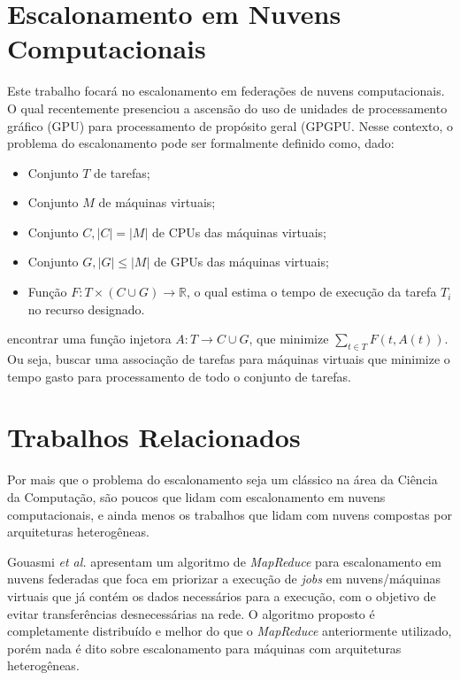 \section{Escalonamento em Nuvens Computacionais}

Este trabalho focará no escalonamento em federações de nuvens computacionais. O qual recentemente presenciou a ascensão do uso de unidades de processamento gráfico (\acrfull{GPU}) para processamento de propósito geral (\acrfull{GPGPU}\cite{Dimitrov:2009:USA:1513895.1513907}\cite{Yang:2010:GCM:1809028.1806606}. Nesse contexto, o problema do escalonamento pode ser formalmente definido como, dado:\\

\begin{itemize}
	\item Conjunto $T$ de tarefas;
	\item Conjunto $M$ de máquinas virtuais;
	\item Conjunto $C, |C| = |M|$ de CPUs das máquinas virtuais;
	\item Conjunto $G,  |G| \le |M|$ de GPUs das máquinas virtuais;
	\item Função $F: T \times (C \cup G) \to \mathbb{R}$, o qual estima o tempo de execução da tarefa $T_{i}$ no recurso designado.
\end{itemize}
encontrar uma função injetora $A: T \to C \cup G$, que minimize $\sum_{t \in T} F(t, A(t) )$.\\

Ou seja, buscar uma associação de tarefas para máquinas virtuais que minimize o tempo gasto para processamento de todo o conjunto de tarefas.

\section{Trabalhos Relacionados}

Por mais que o problema do escalonamento seja um clássico na área da Ciência da Computação, são poucos que lidam com escalonamento em nuvens computacionais, e ainda menos os trabalhos que lidam com nuvens compostas por arquiteturas heterogêneas. 

Gouasmi \textit{et al.} \cite{MapReduce_sched_8034997} apresentam um algoritmo de \textit{MapReduce}\cite{Dean:2008:MSD:1327452.1327492} para escalonamento em nuvens federadas que foca em priorizar a execução de \textit{jobs} em nuvens/máquinas virtuais que já contém os dados necessários para a execução, com o objetivo de evitar transferências desnecessárias na rede. O algoritmo proposto é completamente distribuído e melhor do que o \textit{MapReduce} anteriormente utilizado, porém nada é dito sobre escalonamento para máquinas com arquiteturas heterogêneas.

